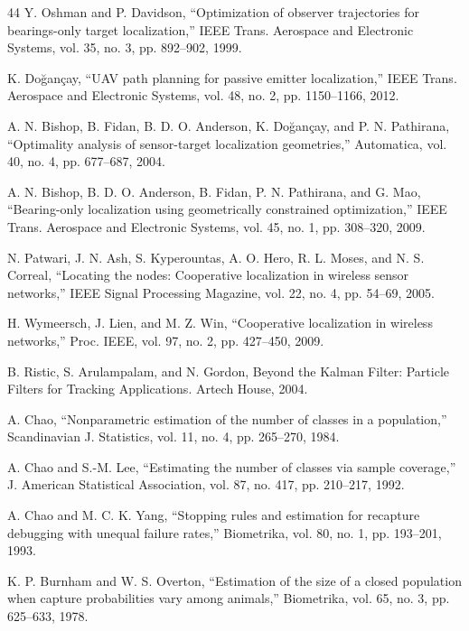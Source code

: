 \documentclass[journal]{IEEEtran}
\begin{document}
\begin{thebibliography}{44}
 Y. Oshman and P. Davidson, ``Optimization of observer trajectories for bearings-only target localization,'' IEEE Trans. Aerospace and Electronic Systems, vol. 35, no. 3, pp. 892--902, 1999.

 K. Doğançay, ``UAV path planning for passive emitter localization,'' IEEE Trans. Aerospace and Electronic Systems, vol. 48, no. 2, pp. 1150--1166, 2012.

 A. N. Bishop, B. Fidan, B. D. O. Anderson, K. Doğançay, and P. N. Pathirana, ``Optimality analysis of sensor-target localization geometries,'' Automatica, vol. 40, no. 4, pp. 677--687, 2004.

 A. N. Bishop, B. D. O. Anderson, B. Fidan, P. N. Pathirana, and G. Mao, ``Bearing-only localization using geometrically constrained optimization,'' IEEE Trans. Aerospace and Electronic Systems, vol. 45, no. 1, pp. 308--320, 2009.

 N. Patwari, J. N. Ash, S. Kyperountas, A. O. Hero, R. L. Moses, and N. S. Correal, ``Locating the nodes: Cooperative localization in wireless sensor networks,'' IEEE Signal Processing Magazine, vol. 22, no. 4, pp. 54--69, 2005.

 H. Wymeersch, J. Lien, and M. Z. Win, ``Cooperative localization in wireless networks,'' Proc. IEEE, vol. 97, no. 2, pp. 427--450, 2009.

 B. Ristic, S. Arulampalam, and N. Gordon, Beyond the Kalman Filter: Particle Filters for Tracking Applications. Artech House, 2004.

 A. Chao, ``Nonparametric estimation of the number of classes in a population,'' Scandinavian J. Statistics, vol. 11, no. 4, pp. 265--270, 1984.

 A. Chao and S.-M. Lee, ``Estimating the number of classes via sample coverage,'' J. American Statistical Association, vol. 87, no. 417, pp. 210--217, 1992.

 A. Chao and M. C. K. Yang, ``Stopping rules and estimation for recapture debugging with unequal failure rates,'' Biometrika, vol. 80, no. 1, pp. 193--201, 1993.

 K. P. Burnham and W. S. Overton, ``Estimation of the size of a closed population when capture probabilities vary among animals,'' Biometrika, vol. 65, no. 3, pp. 625--633, 1978.

\end{thebibliography}
\end{document}
